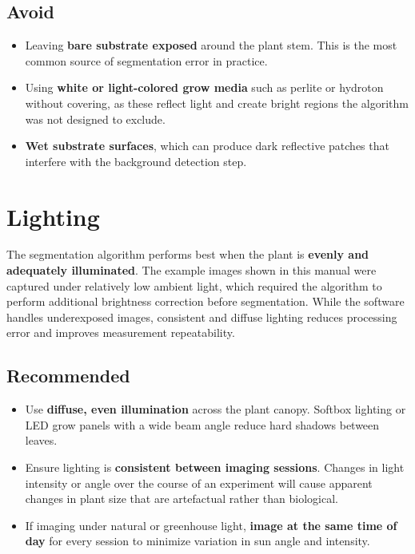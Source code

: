 \documentclass[12pt,a4paper,oneside]{report}
\begin{document}
\subsection*{Avoid}

\begin{itemize}
    \item Leaving \textbf{bare substrate exposed} around the plant stem. This is the most common source of segmentation error in practice.
    \item Using \textbf{white or light-colored grow media} such as perlite or hydroton without covering, as these reflect light and create bright regions the algorithm was not designed to exclude.
    \item \textbf{Wet substrate surfaces}, which can produce dark reflective patches that interfere with the background detection step.
\end{itemize}

\section{Lighting}

The segmentation algorithm performs best when the plant is \textbf{evenly and adequately illuminated}. The example images shown in this manual were captured under relatively low ambient light, which required the algorithm to perform additional brightness correction before segmentation. While the software handles underexposed images, consistent and diffuse lighting reduces processing error and improves measurement repeatability.

\subsection*{Recommended}

\begin{itemize}
    \item Use \textbf{diffuse, even illumination} across the plant canopy. Softbox lighting or LED grow panels with a wide beam angle reduce hard shadows between leaves.
    \item Ensure lighting is \textbf{consistent between imaging sessions}. Changes in light intensity or angle over the course of an experiment will cause apparent changes in plant size that are artefactual rather than biological.
    \item If imaging under natural or greenhouse light, \textbf{image at the same time of day} for every session to minimize variation in sun angle and intensity.
\end{itemize}
\end{document}
